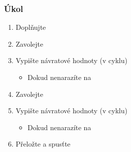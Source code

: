 \begin{frame}
  \frametitle{Úkol}

  \begin{enumerate}
    \item Doplňujte 
    \item Zavolejte 
    \item Vypište návratové hodnoty (v cyklu)
    \begin{itemize}
      \item Dokud nenarazíte na 
    \end{itemize}
    \item Zavolejte 
    \item Vypište návratové hodnoty (v cyklu)
    \begin{itemize}
      \item Dokud nenarazíte na 
    \end{itemize}
    \item Přeložte a spusťte
  \end{enumerate}

\end{frame}

